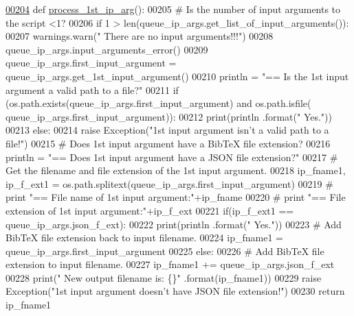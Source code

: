 \begin{DoxyCode}
\hypertarget{classutilities_1_1queue__ip__arguments_1_1queue__ip__args_l00204}{}\hyperlink{classutilities_1_1queue__ip__arguments_1_1queue__ip__args_ae1fc6d7af2e429d0656dbf388711db94}{00204}     \textcolor{keyword}{def }\hyperlink{classutilities_1_1queue__ip__arguments_1_1queue__ip__args_ae1fc6d7af2e429d0656dbf388711db94}{process\_1st\_ip\_arg}():
00205         \textcolor{comment}{#   Is the number of input arguments to the script <1?}
00206         \textcolor{keywordflow}{if} 1 > len(queue\_ip\_args.get\_list\_of\_input\_arguments()):
00207             warnings.warn(\textcolor{stringliteral}{" There are no input arguments!!!"})
00208             queue\_ip\_args.input\_arguments\_error()
00209         queue\_ip\_args.first\_input\_argument = queue\_ip\_args.get\_1st\_input\_argument()
00210         println = \textcolor{stringliteral}{"==   Is the 1st input argument a valid path to a file?"}
00211         \textcolor{keywordflow}{if} (os.path.exists(queue\_ip\_args.first\_input\_argument) \textcolor{keywordflow}{and} os.path.isfile(
      queue\_ip\_args.first\_input\_argument)):
00212             print(println .format(\textcolor{stringliteral}{" Yes."}))
00213         \textcolor{keywordflow}{else}:
00214             \textcolor{keywordflow}{raise} Exception(\textcolor{stringliteral}{"1st input argument isn't a valid path to a file!"})
00215         \textcolor{comment}{#   Does 1st input argument have a BibTeX file extension?}
00216         println = \textcolor{stringliteral}{"==   Does 1st input argument have a JSON file extension?"}
00217         \textcolor{comment}{#   Get the filename and file extension of the 1st input argument.}
00218         ip\_fname1, ip\_f\_ext1 = os.path.splitext(queue\_ip\_args.first\_input\_argument)
00219 \textcolor{comment}{#   print "==   File name of 1st input argument:"+ip\_fname}
00220 \textcolor{comment}{#   print "==   File extension of 1st input argument:"+ip\_f\_ext}
00221         if(ip\_f\_ext1 == queue\_ip\_args.json\_f\_ext):
00222             print(println .format(\textcolor{stringliteral}{" Yes."}))
00223             \textcolor{comment}{#   Add BibTeX file extension back to input filename.}
00224             ip\_fname1 = queue\_ip\_args.first\_input\_argument
00225         \textcolor{keywordflow}{else}:
00226             \textcolor{comment}{#   Add BibTeX file extension to input filename.}
00227             ip\_fname1 += queue\_ip\_args.json\_f\_ext
00228             print(\textcolor{stringliteral}{" New output filename is: \{\}"} .format(ip\_fname1))
00229             \textcolor{keywordflow}{raise} Exception(\textcolor{stringliteral}{"1st input argument doesn't have JSON file extension!"})
00230         \textcolor{keywordflow}{return} ip\_fname1
\end{DoxyCode}
\hypertarget{classutilities_1_1queue__ip__arguments_1_1queue__ip__args_a82d245379c48196f61d4268882dd5c6d}{}
